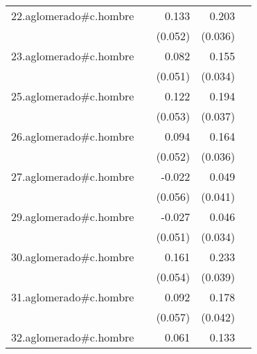 {\begin{longtable}{l*{4}{D{.}{.}{-1}}}
\addlinespace
22.aglomerado#c.hombre&                     &       0.133\sym{*}  &       0.203\sym{***}&                     \\
            &                     &     (0.052)         &     (0.036)         &                     \\
\addlinespace
23.aglomerado#c.hombre&                     &       0.082         &       0.155\sym{***}&                     \\
            &                     &     (0.051)         &     (0.034)         &                     \\
\addlinespace
25.aglomerado#c.hombre&                     &       0.122\sym{*}  &       0.194\sym{***}&                     \\
            &                     &     (0.053)         &     (0.037)         &                     \\
\addlinespace
26.aglomerado#c.hombre&                     &       0.094         &       0.164\sym{***}&                     \\
            &                     &     (0.052)         &     (0.036)         &                     \\
\addlinespace
27.aglomerado#c.hombre&                     &      -0.022         &       0.049         &                     \\
            &                     &     (0.056)         &     (0.041)         &                     \\
\addlinespace
29.aglomerado#c.hombre&                     &      -0.027         &       0.046         &                     \\
            &                     &     (0.051)         &     (0.034)         &                     \\
\addlinespace
30.aglomerado#c.hombre&                     &       0.161\sym{**} &       0.233\sym{***}&                     \\
            &                     &     (0.054)         &     (0.039)         &                     \\
\addlinespace
31.aglomerado#c.hombre&                     &       0.092         &       0.178\sym{***}&                     \\
            &                     &     (0.057)         &     (0.042)         &                     \\
\addlinespace
32.aglomerado#c.hombre&                     &       0.061         &       0.133\sym{***}&                     \\

\end{longtable}}
